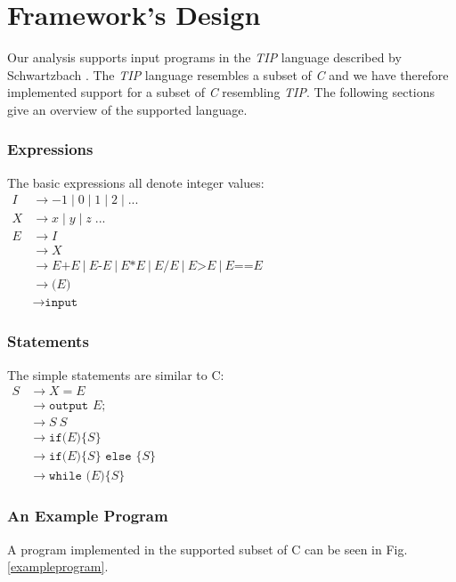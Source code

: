 \section{Framework's Design}

\newpar Our analysis supports input programs in the \textit{TIP} language described by Schwartzbach \cite{spa}. The \textit{TIP} language resembles a subset of \textit{C} and we have therefore implemented support for a subset of \textit{C} resembling \textit{TIP}. The following sections give an overview of the supported language.

\subsubsection{Expressions}
The basic expressions all denote integer values: \\

$
\begin{aligned}
    I & \rightarrow -1\;|\;0\;|\;1\;|\;2\;|\;... \\
    X & \rightarrow x\;|\;y\;|\;z\;... \\
    E & \rightarrow { I } \\
    & \rightarrow { X } \\ 
    & \rightarrow E\texttt{+}E\:|\:E\texttt{-}E\:|\:E \texttt{*} E\:|\:E \texttt{/} E\:|\:E\texttt{>}E\:|\:E\texttt{==}E \\ 
    & \rightarrow\texttt{(}E\texttt{)} \\
    & \rightarrow\texttt{input} 
\end{aligned}
$


\subsubsection{Statements}
The simple statements are similar to C: \\

$
\begin{aligned} S & \rightarrow X = E \\
& \rightarrow \texttt {output } E ; \\ 
& \rightarrow S\:S \\ 
& \rightarrow \texttt{if(}E\texttt{)}\{S\} \\ 
& \rightarrow \texttt{if(} E \texttt{)}\{S\} \texttt { else }\{S\} \\ 
& \rightarrow \texttt {while (}E\texttt{)}\{ S\}
\end{aligned}
$

\subsubsection{An Example Program}
A program implemented in the supported subset of C can be seen in Fig. \ref{exampleprogram}.

